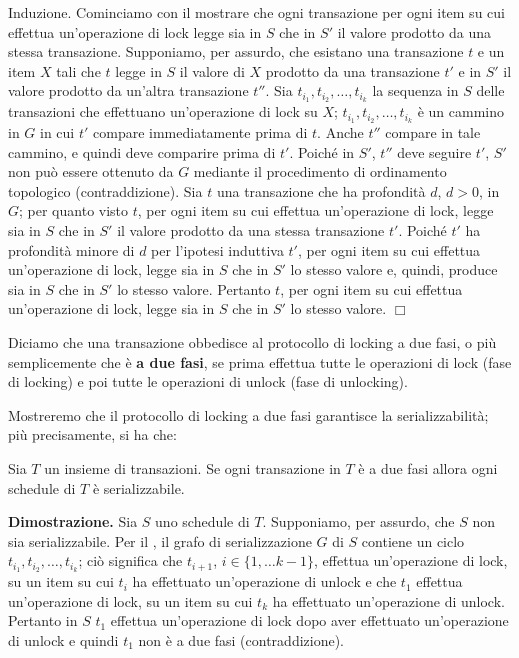 Induzione. Cominciamo con il mostrare che ogni transazione per ogni item su cui effettua
un'operazione di lock legge sia in $S$ che in $S'$ il valore prodotto da una stessa transazione.
Supponiamo, per assurdo, che esistano una transazione $t$ e un item $X$ tali che $t$ legge in $S$ il valore
di $X$ prodotto da una transazione $t'$ e in $S'$ il valore prodotto da un'altra transazione $t''$. Sia $t_{i_1},
t_{i_2}, \ldots, t_{i_k}$ la sequenza in $S$ delle transazioni che effettuano un'operazione di lock su $X$; $t_{i_1},
t_{i_2}, \ldots, t_{i_k}$ è un cammino in $G$ in cui $t'$ compare immediatamente prima di $t$. Anche $t''$ compare in tale
cammino, e quindi deve comparire prima di $t'$. Poiché in $S'$, $t''$ deve seguire $t'$, $S'$ non può essere
ottenuto da $G$ mediante il procedimento di ordinamento topologico (contraddizione).
Sia $t$ una transazione che ha profondità $d$, $d>0$, in $G$; per quanto visto $t$, per ogni item su cui
effettua un'operazione di lock, legge sia in $S$ che in $S'$ il valore prodotto da una stessa transazione
$t'$. Poiché $t'$ ha profondità minore di $d$ per l'ipotesi induttiva $t'$, per ogni item su cui effettua
un'operazione di lock, legge sia in $S$ che in $S'$ lo stesso valore e, quindi, produce sia in $S$ che in $S'$ lo
stesso valore. Pertanto $t$, per ogni item su cui effettua un'operazione di lock, legge sia in $S$ che in $S'$
lo stesso valore. \hfill $\Box$\\
\begin{defn}
Diciamo che una transazione obbedisce al protocollo di locking a due fasi, o più semplicemente che
è \textbf{a due fasi}, se prima effettua tutte le operazioni di lock (fase di locking) e poi tutte le operazioni di
unlock (fase di unlocking). 
\end{defn}
Mostreremo che il protocollo di locking a due fasi garantisce la serializzabilità; più precisamente, si ha che:
\begin{theo}
Sia $T$ un insieme di transazioni. Se ogni transazione in $T$ è a due fasi allora ogni
schedule di $T$ è serializzabile. 
\end{theo}
\textbf{Dimostrazione.} Sia $S$ uno schedule di $T$. Supponiamo, per assurdo, che $S$ non sia serializzabile. Per il
, il grafo di serializzazione $G$ di $S$ contiene un ciclo $t_{i_1}, t_{i_2}, \ldots,
t_{i_k}$; ciò significa che $t_{i+1}$, $i\in \{1,\ldots k-1\}$, effettua un'operazione di lock, su un item su cui $t_i$
ha effettuato un'operazione di unlock e che $t_1$ effettua un'operazione di lock, su un item su cui $t_k$ ha effettuato
un'operazione di unlock. Pertanto in $S$ $t_1$ effettua un'operazione di lock dopo aver effettuato un'operazione di unlock
e quindi $t_1$ non è a due fasi (contraddizione).\\

